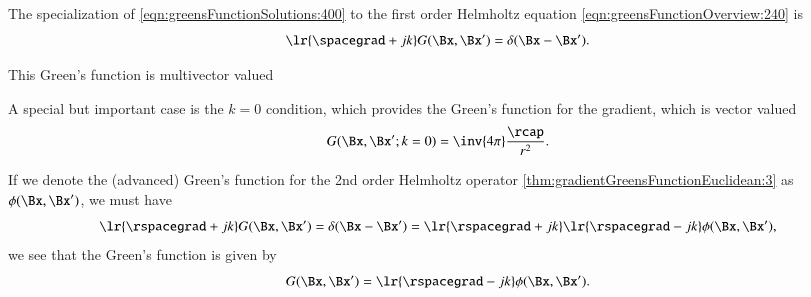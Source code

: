 %
%

The specialization of \cref{eqn:greensFunctionSolutions:400} to the first order Helmholtz equation \cref{eqn:greensFunctionOverview:240} is
\begin{dmath}\label{eqn:greensFunctionFirstOrderHelmholtz:700}
\lr{ \spacegrad + j k } G(\Bx, \Bx')  = \delta(\Bx - \Bx').
\end{dmath}

This Green's function is multivector valued


A special but important case is the \( k = 0 \) condition, which provides the
Green's function for the gradient, which is vector valued
\begin{equation}\label{eqn:greensFunctionFirstOrderHelmholtz:900}
G(\Bx, \Bx' ; k = 0) = \inv{4 \pi} \frac{\rcap}{r^2}.
\end{equation}

If we denote the (advanced) Green's function for the 2nd order Helmholtz operator
\cref{thm:gradientGreensFunctionEuclidean:3}
as \( \phi(\Bx, \Bx') \), we must have
\begin{equation}\label{eqn:greensFunctionFirstOrderHelmholtz:740}
\lr{ \rspacegrad + j k } G(\Bx, \Bx') = \delta(\Bx - \Bx') =
\lr{ \rspacegrad + j k } \lr{ \rspacegrad - j k } \phi(\Bx, \Bx'),
\end{equation}
we see that the Green's function is given by
\begin{dmath}\label{eqn:greensFunctionFirstOrderHelmholtz:760}
G(\Bx, \Bx')
=
\lr{ \rspacegrad - j k } \phi(\Bx, \Bx').
\end{dmath}

